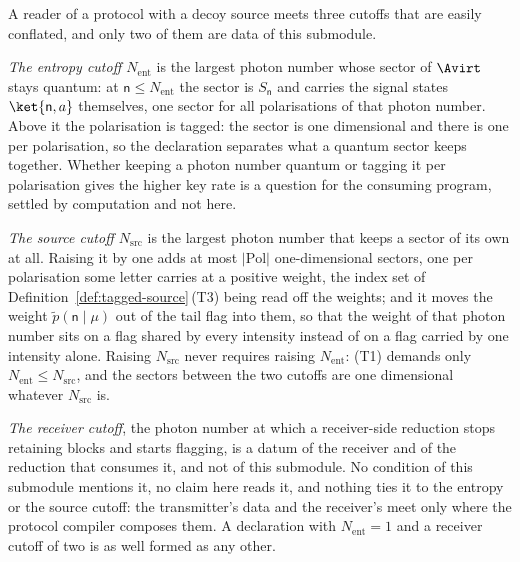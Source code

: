 
\begin{remark}\label{rem:cutoffs}
A reader of a protocol with a decoy source meets three cutoffs that are easily
conflated, and only two of them are data of this submodule.

\emph{The entropy cutoff $N_{\mathrm{ent}}$} is the largest photon number whose
sector of $\Avirt$ stays quantum: at $\mathsf{n}\le N_{\mathrm{ent}}$ the sector
is $S_{\mathsf{n}}$ and carries the signal states $\ket{\mathsf{n},a}$
themselves, one sector for all polarisations of that photon number. Above it the
polarisation is tagged: the sector is one dimensional and there is one per
polarisation, so the declaration separates what a quantum sector keeps
together. Whether keeping a photon number quantum or tagging it per
polarisation gives the higher key rate is a question for the consuming program,
settled by computation and not here.

\emph{The source cutoff $N_{\mathrm{src}}$} is the largest photon number that
keeps a sector of its own at all. Raising it by one adds at most
$|\mathrm{Pol}|$ one-dimensional sectors, one per polarisation some letter
carries at a positive weight, the index set of
Definition~\ref{def:tagged-source}\,(T3) being read off the weights; and it
moves the weight $\tilde p(\mathsf{n}\mid\mu)$ out of the tail flag into them,
so that the weight of that photon number sits on a flag shared by every
intensity instead of on a flag carried by one intensity alone. Raising
$N_{\mathrm{src}}$ never requires raising $N_{\mathrm{ent}}$: (T1) demands only
$N_{\mathrm{ent}}\le N_{\mathrm{src}}$, and the sectors between the two cutoffs
are one dimensional whatever $N_{\mathrm{src}}$ is.

\emph{The receiver cutoff}, the photon number at which a receiver-side
reduction stops retaining blocks and starts flagging, is a datum of the
receiver and of the reduction that consumes it, and not of this submodule. No
condition of this submodule mentions it, no claim here reads it, and nothing
ties it to the entropy or the source cutoff: the transmitter's data and the
receiver's meet only where the protocol compiler composes them. A declaration
with $N_{\mathrm{ent}}=1$ and a receiver cutoff of two is as well formed as any
other.


\end{remark}
